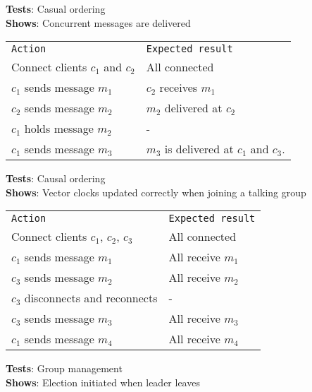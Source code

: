 	\textbf{Tests}: Casual ordering \\
	\textbf{Shows}: Concurrent messages are delivered \\

	\begin{tabular}{ll}
		\texttt{Action} & \texttt{Expected result} \\
		Connect clients $c_1$ and $c_2$ & All connected\\
		$c_1$ sends message $m_1$ & $c_2$ receives $m_1$\\
		$c_2$ sends message $m_2$ & $m_2$ delivered at $c_2$ \\
		$c_1$ holds message $m_2$ & -\\
		$c_1$ sends message $m_3$ & $m_3$ is delivered at $c_1$ and $c_3$. \\
	\end{tabular}

	\textbf{Tests}: Causal ordering \\
	\textbf{Shows}: Vector clocks updated correctly when joining a talking group\\

	\begin{tabular}{ll}
		\texttt{Action} & \texttt{Expected result} \\
		Connect clients $c_1$, $c_2$, $c_3$ & All connected\\
		$c_1$ sends message $m_1$ & All receive $m_1$\\
		$c_3$ sends message $m_2$ & All receive $m_2$ \\
		$c_3$ disconnects and reconnects & - \\
		$c_3$ sends message $m_3$ & All receive $m_3$ \\
		$c_1$ sends message $m_4$ & All receive $m_4$ \\
	\end{tabular}





	\textbf{Tests}: Group management \\
	\textbf{Shows}: Election initiated when leader leaves \\

